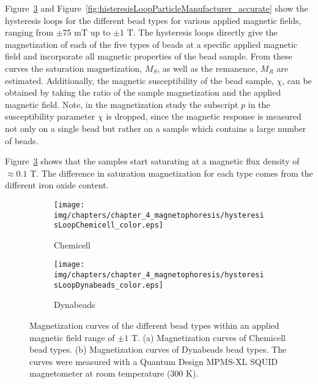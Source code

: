 Figure~\ref{fig:histeresisLoopParticleManufacturer} and Figure~\ref{fig:histeresisLoopParticleManufacturer_accurate} show the hysteresis loops for the different bead types for various applied magnetic fields, ranging from $\pm75$ mT up to $\pm1$ T. The hysteresis loops directly give the magnetization of each of the five types of beads at a specific applied magnetic field and incorporate all magnetic properties of the bead sample. From these curves the saturation magnetization, $M_{S}$, as well as the remanence, $M_{R}$ are estimated. Additionally, the magnetic susceptibility of the bead sample, $\chi$, can be obtained by taking the ratio of the sample magnetization and the applied magnetic field. Note, in the magnetization study the subscript $p$ in the susceptibility parameter $\chi$ is dropped, since the magnetic response is measured not only on a single bead but rather on a sample which contains a large number of beads.

Figure~\ref{fig:histeresisLoopParticleManufacturer} shows that the samples start saturating at a magnetic flux density of $\approx 0.1$ T. The difference in saturation magnetization for each type comes from the different iron oxide content.
 
\begin{figure}[htb]
        \centering
        \begin{subfigure}[b]{0.48\textwidth}
                \texttt{[image: img/chapters/chapter\_4\_magnetophoresis/hysteresisLoopChemicell\_color.eps]}
                \caption{Chemicell}
                \label{fig:hysteresisLoopChemicell}
        \end{subfigure}
        \hfill
        \begin{subfigure}[b]{0.48\textwidth}
                \texttt{[image: img/chapters/chapter\_4\_magnetophoresis/hysteresisLoopDynabeads\_color.eps]}
                \caption{Dynabeads}
                \label{fig:hysteresisLoopDynabeads}
        \end{subfigure}
        \caption[Magnetization curves of Chemicell and Dynabeads particles in the range of $\pm1$ T]{Magnetization curves of the different bead types within an applied magnetic field range of $\pm1$ T. (a) Magnetization curves of Chemicell bead types. (b) Magnetization curves of Dynabeads bead types. The curves were measured with a Quantum Design MPMS-XL SQUID magnetometer at room temperature ($300$ K).}
\label{fig:histeresisLoopParticleManufacturer}
\end{figure}

